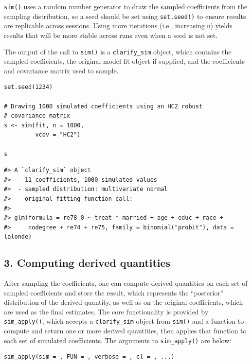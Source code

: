 \texttt{sim()} uses a random number generator to draw the sampled coefficients from the sampling distribution, so a seed should be set using \texttt{set.seed()} to ensure results are replicable across sessions. Using more iterations (i.e., increasing \texttt{n}) yields results that will be more stable across runs even when a seed is not set.

The output of the call to \texttt{sim()} is a \texttt{clarify\_sim} object, which contains the sampled coefficients, the original model fit object if supplied, and the coefficients and covariance matrix used to sample.

\begin{verbatim}
set.seed(1234)

# Drawing 1000 simulated coefficients using an HC2 robust
# covariance matrix
s <- sim(fit, n = 1000,
         vcov = "HC2")

s
\end{verbatim}

\begin{verbatim}
#> A `clarify_sim` object
#>  - 11 coefficients, 1000 simulated values
#>  - sampled distribution: multivariate normal
#>  - original fitting function call:
#> 
#> glm(formula = re78_0 ~ treat * married + age + educ + race + 
#>     nodegree + re74 + re75, family = binomial("probit"), data = lalonde)
\end{verbatim}

\hypertarget{computing-derived-quantities}{%
\subsection{3. Computing derived quantities}\label{computing-derived-quantities}}

After sampling the coefficients, one can compute derived quantities on each set of sampled coefficients and store the result, which represents the ``posterior'' distribution of the derived quantity, as well as on the original coefficients, which are used as the final estimates. The core functionality is provided by \texttt{sim\_apply()}, which accepts a \texttt{clarify\_sim} object from \texttt{sim()} and a function to compute and return one or more derived quantities, then applies that function to each set of simulated coefficients. The arguments to \texttt{sim\_apply()} are below:

\begin{verbatim}
sim_apply(sim = , FUN = , verbose = , cl = , ...)
\end{verbatim}

